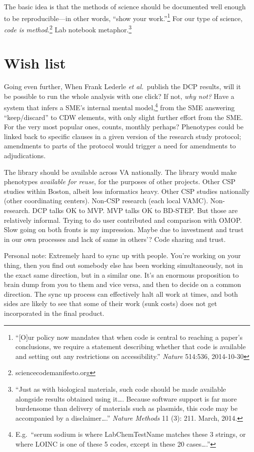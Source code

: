 \documentclass{tufte-handout}
\begin{document}
\newpage

The basic idea is that the methods of science should be documented
well enough to be reproducible---in other words, ``show your
work.''\footnote{``[O]ur policy now mandates that when code is central
  to reaching a paper's conclusions, we require a statement describing
  whether that code is available and setting out any restrictions on
  accessibility.'' \emph{Nature} 514:536, 2014-10-30} For our type of
science, \emph{code is method.}\footnote{sciencecodemanifesto.org} Lab
notebook metaphor.\footnote{``Just as with biological materials, such
  code should be made available alongside results obtained using
  it\ldots{}. Because software support is far more burdensome than
  delivery of materials such as plasmids, this code may be accompanied
  by a disclaimer\ldots{}.'' \emph{Nature Methods} 11 (3): 211. March,
  2014.}

\section{Wish list}

Going even further, When Frank Lederle \emph{et al.}\ publish the DCP
results, will it be possible to run the whole analysis with one click?
If not, \emph{why not?} Have a system that infers a SME's internal
mental model,\footnote{E.g.\ ``serum sodium is where LabChemTestName
  matches these 3 strings, or where LOINC is one of these 5 codes,
  except in these 20 cases\ldots{}.''} from the SME answering
``keep/discard'' to CDW elements, with only slight further effort from
the SME. For the very most popular ones, counts, monthly perhaps?
Phenotypes could be linked back to specific clauses in a given version
of the research study protocol; amendments to parts of the protocol
would trigger a need for amendments to adjudications.

The library should be available across VA nationally. The library
would make phenotypes \emph{available for reuse}, for the purposes of
other projects. Other CSP studies within Boston, albeit less
informatics heavy. Other CSP studies nationally (other coordinating
centers). Non-CSP research (each local VAMC). Non-research. DCP talks
OK to MVP. MVP talks OK to BD-STEP. But those are relatively informal.
Trying to do user contributed and comparison with OMOP. Slow going on
both fronts is my impression. Maybe due to investment and trust in our
own processes and lack of same in others'? Code sharing and trust.

Personal note: Extremely hard to sync up with people. You're working
on your thing, then you find out somebody else has been working
simultaneously, not in the exact same direction, but in a similar one.
It's an enormous proposition to brain dump from you to them and vice
versa, and then to decide on a common direction. The sync up process
can effectively halt all work at times, and both sides are likely to
see that some of their work (sunk costs) does not get incorporated in
the final product.
\end{document}
